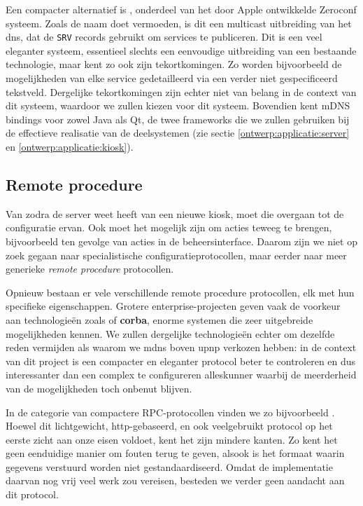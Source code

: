 \documentclass[verslag.tex]{subfiles}
\begin{document}
Een compacter alternatief is , onderdeel van het door Apple ontwikkelde Zeroconf systeem. Zoals de naam doet vermoeden, is dit een multicast uitbreiding van het \ac{dns}, dat de \texttt{SRV} records gebruikt om services te publiceren. Dit is een veel eleganter systeem, essentieel slechts een eenvoudige uitbreiding van een bestaande technologie, maar kent zo ook zijn tekortkomingen. Zo worden bijvoorbeeld de mogelijkheden van elke service gedetailleerd via een verder niet gespecificeerd tekstveld. Dergelijke tekortkomingen zijn echter niet van belang in de context van dit systeem, waardoor we zullen kiezen voor dit systeem. Bovendien kent mDNS bindings voor zowel Java als Qt, de twee frameworks die we zullen gebruiken bij de effectieve realisatie van de deelsystemen (zie sectie \ref{ontwerp:applicatie:server} en \ref{ontwerp:applicatie:kiosk}).

\subsection{Remote procedure}

Van zodra de server weet heeft van een nieuwe kiosk, moet die overgaan tot de configuratie ervan. Ook moet het mogelijk zijn om acties teweeg te brengen, bijvoorbeeld ten gevolge van acties in de beheersinterface. Daarom zijn we niet op zoek gegaan naar specialistische configuratieprotocollen, maar eerder naar meer generieke \emph{remote procedure} protocollen.

Opnieuw bestaan er vele verschillende remote procedure protocollen, elk met hun specifieke eigenschappen. Grotere enterprise-projecten geven vaak de voorkeur aan technologieën zoals  of \textbf{\ac{corba}}, enorme systemen die zeer uitgebreide mogelijkheden kennen. We zullen dergelijke technologieën echter om dezelfde reden vermijden als waarom we \ac{mdns} boven \ac{upnp} verkozen hebben: in de context van dit project is een compacter en eleganter protocol beter te controleren en dus interessanter dan een complex te configureren alleskunner waarbij de meerderheid van de mogelijkheden toch onbenut blijven.

In de categorie van compactere RPC-protocollen vinden we zo bijvoorbeeld . Hoewel dit lichtgewicht, \ac{http}-gebaseerd, en ook veelgebruikt protocol op het eerste zicht aan onze eisen voldoet, kent het zijn mindere kanten. Zo kent het geen eenduidige manier om fouten terug te geven, alsook is het formaat waarin gegevens verstuurd worden niet gestandaardiseerd. Omdat de implementatie daarvan nog vrij veel werk zou vereisen, besteden we verder geen aandacht aan dit protocol.
\end{document}
